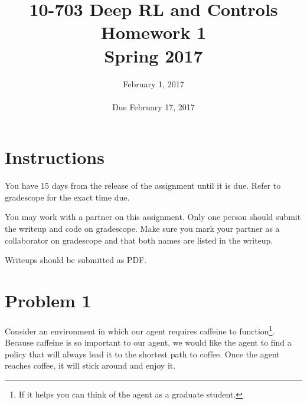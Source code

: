 \documentclass[12pt]{article}
\title{10-703 Deep RL and Controls\\
  Homework 1\\
  Spring 2017\\
}
\date{February 1, 2017\\
  \hspace{1cm}\\
Due February 17, 2017}
\begin{document}
\maketitle

\section*{Instructions}

You have 15 days from the release of the assignment until it is
due. Refer to gradescope for the exact time due.

You may work with a partner on this assignment. Only one person should
submit the writeup and code on gradescope. Make sure you mark your
partner as a collaborator on gradescope and that both names are listed
in the writeup.

Writeups should be submitted as PDF.



\section*{Problem 1}
\label{sec:p1}



Consider an environment in which our agent requires caffeine to
function\footnote{If it helps you can think of the agent as a graduate
  student.}. Because caffeine is so important to our agent, we would
like the agent to find a policy that will always lead it to
the shortest path to coffee. Once the agent reaches coffee, it
will stick around and enjoy it.
\end{document}
